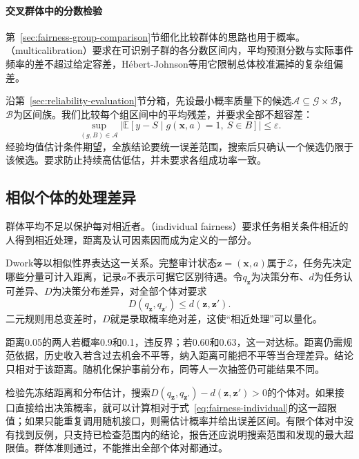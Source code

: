 \paragraph{交叉群体中的分数检验}

第~\ref{sec:fairness-group-comparison}节细化比较群体的思路也用于概率。（multicalibration）要求在可识别子群的各分数区间内，平均预测分数与实际事件频率的差不超过给定容差，Hébert-Johnson等用它限制总体校准漏掉的复杂组偏差。

沿第~\ref{sec:reliability-evaluation}节分箱，先设最小概率质量下的候选$\mathcal A\subseteq\mathcal G\times\mathcal B$，$\mathcal B$为区间族。我们比较每个组区间中的平均残差，并要求全部不超容差：
\begin{equation}
 \sup_{(g,B)\in\mathcal A}
 \left|\mathbb E[y-S\mid
       g(\bm{x},a)=1,\ S\in B]\right|
 \leq\varepsilon.
 \label{eq:fairness-multicalibration}
\end{equation}
经验均值估计条件期望，全族结论要统一误差范围，搜索后只确认一个候选仍限于该候选。要求防止持续高估低估，并未要求各组成功率一致。

\subsection{相似个体的处理差异}
\label{sec:fairness-individual-comparison}

群体平均不足以保护每对相近者。（individual fairness）要求任务相关条件相近的人得到相近处理，距离及认可因素因而成为定义的一部分。

Dwork等以相似性界表达这一关系。完整审计状态$\bm z=(\bm x,a)$属于$\mathcal Z$，任务先决定哪些分量可计入距离，记录$a$不表示可据它区别待遇。令$q_{\bm z}$为决策分布、$d$为任务认可差异、$D$为决策分布差异，对全部个体对要求
\begin{equation}
 D(q_{\bm z},q_{\bm z'})\leq d(\bm z,\bm z').
 \label{eq:fairness-individual}
\end{equation}
二元规则用总变差时，$D$就是录取概率绝对差，这使“相近处理”可以量化。

距离0.05的两人若概率0.9和0.1，违反界；若0.60和0.63，这一对达标。距离仍需规范依据，历史收入若含过去机会不平等，纳入距离可能把不平等当合理差异。结论只相对于该距离。随机化保护事前分布，同等人一次抽签仍可能结果不同。

检验先冻结距离和分布估计，搜索$D(q_{\bm z},q_{\bm z'})-d(\bm z,\bm z')>0$的个体对。如果接口直接给出决策概率，就可以计算相对于式~\eqref{eq:fairness-individual}的这一超限值；如果只能重复调用随机接口，则需估计概率并给出误差区间。有限个体对中没有找到反例，只支持已检查范围内的结论，报告还应说明搜索范围和发现的最大超限值。群体准则通过，不能推出全部个体对都通过。

